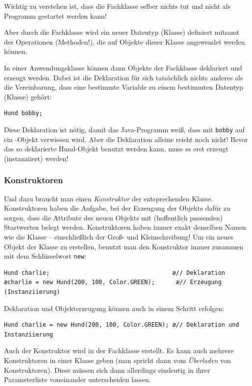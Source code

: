 Wichtig zu verstehen ist, dass die Fachklasse selber nichts tut und nicht als Programm gestartet
werden kann!

Aber durch die Fachklasse wird ein neuer Datentyp (Klasse) definiert mitsamt der Operationen
(Methoden!), die auf Objekte dieser Klasse angewendet werden können.

In einer Anwendungsklasse können dann Objekte der Fachklasse deklariert und erzeugt werden.
Dabei ist die Deklaration für sich tatsächlich nichts anderes als die Vereinbarung, dass eine bestimmte
Variable zu einem bestimmten Datentyp (Klasse) gehört:

\begin{lstlisting}
Hund bobby;
\end{lstlisting}

Diese Deklaration ist nötig, damit das Java-Programm weiß, dass mit \lstinline|bobby| auf ein -Objekt verwiesen wird.
Aber die Deklaration alleine reicht noch nicht! Bevor das so deklarierte Hund-Objekt benutzt werden
kann, muss es erst erzeugt (instanziiert) werden! 

\subsubsection{Konstruktoren}

Und dazu braucht man einen \emph{Konstruktor} der entsprechenden Klasse. Konstruktoren haben die Aufgabe,
bei der Erzeugung der Objekte dafür zu sorgen, dass die Attribute des neuen Objekts mit (hoffentlich 
passenden) Startwerten belegt werden. Konstruktoren haben immer exakt denselben Namen wie die Klasse --
einschließlich der Groß- und Kleinschreibung! Um ein neues Objekt der Klasse zu erstellen, benutzt man den
Konstruktor immer zusammen mit dem Schlüsselwort \lstinline|new|:

\begin{lstlisting}
Hund charlie;                                   æ// Deklaration
æcharlie = new Hund(200, 100, Color.GREEN);      æ// Erzeugung (Instanziierung)
\end{lstlisting}

Deklaration und Objekterzeugung können auch in einem Schritt erfolgen:

\begin{lstlisting}
Hund charlie = new Hund(200, 100, Color.GREEN); æ// Deklaration und Instanziierung
\end{lstlisting}

Auch der Konstruktor wird in der Fachklasse erstellt. Es kann auch mehrere Konstruktoren
in einer Klasse geben (man spricht dann vom \emph{Überladen} von Konstruktoren). Diese müssen sich
dann allerdings eindeutig in ihrer Parameterliste voneinander unterscheiden lassen.


